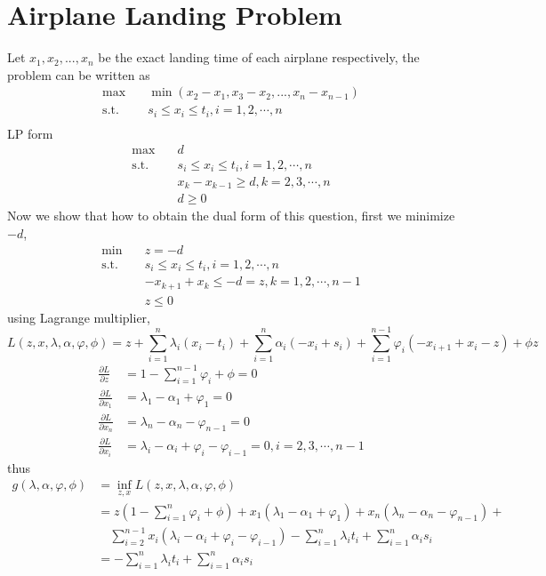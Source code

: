 \section{Airplane Landing Problem}
 Let $x_1, x_2,...,x_n $ be the exact landing time of each airplane respectively, the problem can be written as 
 \[	\begin{split} 
	 \max  \quad &\min(x_2 - x_1, x_3 - x_2, ..., x_n - x_{n-1}) \\
	\text{s.t.} \quad & s_i \leq x_i \leq t_i, i = 1,2,\cdots, n\\
	\end{split}  
 \]
 LP form
 \[
	\begin{split} 
	\max  \quad &d \\
	\text{s.t.} \quad & s_i \leq x_i \leq t_i, i = 1,2,\cdots, n\\
	& x_k - x_{k-1} \geq d, k = 2,3,\cdots, n \\
	&d \geq 0
	\end{split}  
 \]
 Now we show that how to obtain the dual form of this question,
 first we minimize $-d$,
 \[
	 \begin{split} 
	 \min  \quad &z = -d \\
	 \text{s.t.} \quad & s_i \leq x_i \leq t_i, i = 1,2,\cdots, n\\
	 & -x_{k+1} + x_{k} \leq -d = z, k = 1,2,\cdots, n-1 \\
	 &z \leq 0
	 \end{split}  
 \]
 using Lagrange multiplier, 
 \[
	 L(z, x, \lambda, \alpha, \varphi,\phi) = 
	 z + \sum_{i=1}^{n} \lambda_i (x_i - t_i) + 
	 \sum_{i=1}^{n} \alpha_i (-x_i + s_i) + 
	 \sum_{i=1}^{n-1} \varphi_i (-x_{i+1} + x_i - z) + \phi z
 \]
 \[
	\begin{split}  
	 \frac{\partial L}{\partial z} &= 1 - \sum_{i=1}^{n-1} \varphi_i + \phi = 0 \\
	 \frac{\partial L}{\partial x_1} &= \lambda_1 - \alpha_1 + \varphi_1 = 0  \\
	 \frac{\partial L}{\partial x_n} &= \lambda_n - \alpha_n - \varphi_{n-1} = 0 \\
	 \frac{\partial L}{\partial x_i} &= \lambda_i - \alpha_i + \varphi_i - \varphi_{i-1} = 0, i = 2,3,\cdots, n-1 
	 \end{split} 
 \]
 thus
 \[ \begin{split} 
	 g(\lambda,\alpha,\varphi, \phi) &= \inf_{z,x} L(z,x,\lambda, \alpha, \varphi, \phi)  \\ 
	 &= z(1 - \sum_{i=1}^{n}\varphi_i+ \phi)  + x_1(\lambda_1 - \alpha_1 + \varphi_1) + x_n(\lambda_n - \alpha_n - \varphi_{n-1}) + \\
	 &\quad \sum_{i=2}^{n-1} x_i(\lambda_i - \alpha_i + \varphi_i - \varphi_{i-1})
	 - \sum_{i=1}^{n}\lambda_i t_i + \sum_{i=1}^{n} \alpha_i s_i \\
	 &= - \sum_{i=1}^{n}\lambda_i t_i + \sum_{i=1}^{n} \alpha_i s_i
	 \end{split}
 \]
